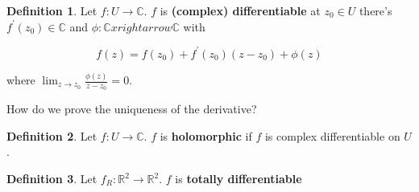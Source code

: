 \documentclass{article}
\theoremstyle{definition}
\newtheorem{definition}{Definition}
\newcommand{\C}{\mathbb{C}}
\newcommand{\R}{\mathbb{R}}
\begin{document}
\begin{definition}
    Let $f: U \xrightarrow{} \C$. $f$ is \textbf{(complex) differentiable} at $z_{0} \in U$ there's $f^{\prime}(z_{0}) \in \C$
    and $\phi: \C xrightarrow{} \C$ with

    \[ f(z) = f(z_{0}) + f^{\prime}(z_{0})(z - z_{0})  + \phi(z)\]

    where $\lim_{z \to z_{0}} \frac{\phi(z)}{z - z_{0}} = 0$.
\end{definition}

How do we prove the uniqueness of the derivative?

\begin{definition}
    Let $f: U \xrightarrow{} \C$. $f$ is \textbf{holomorphic} if $f$ is complex differentiable on $U$.
\end{definition}

\begin{definition}
    Let $f_{R}: \R^{2} \xrightarrow{} \R^{2}$. $f$ is \textbf{totally differentiable}

\end{definition}
\end{document}
